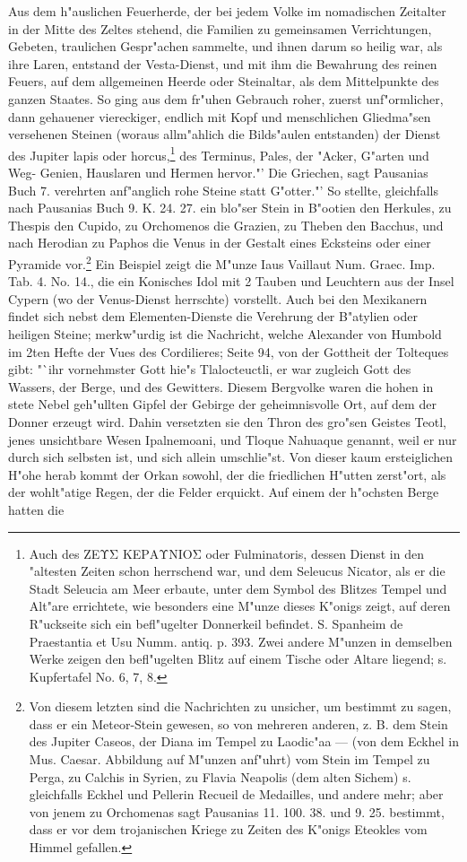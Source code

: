 \documentclass[a4paper, 11pt, oneside, polutonikogreek, german]{article}
\begin{document}
Aus dem h"auslichen Feuerherde, der bei jedem Volke im nomadischen Zeitalter in der Mitte des Zeltes stehend, die Familien zu gemeinsamen Verrichtungen, Gebeten, traulichen Gespr"achen sammelte, und ihnen darum so heilig war, als ihre Laren, entstand der Vesta-Dienst, und mit ihm die Bewahrung des reinen Feuers, auf dem allgemeinen Heerde oder Steinaltar, als dem Mittelpunkte des ganzen Staates. So ging aus dem fr"uhen Gebrauch roher, zuerst unf"ormlicher, dann gehauener viereckiger, endlich mit Kopf und menschlichen Gliedma"sen versehenen Steinen (woraus allm"ahlich die Bilds"aulen entstanden) der Dienst des Jupiter lapis oder horcus,\footnote{Auch des ΖΕΥΣ ΚΕΡΑΥΝΙΟΣ oder Fulminatoris, dessen Dienst in den "altesten Zeiten schon herrschend war, und dem Seleucus Nicator, als er die Stadt Seleucia am Meer erbaute, unter dem Symbol des Blitzes Tempel und Alt"are errichtete, wie besonders eine M"unze dieses K"onigs zeigt, auf deren R"uckseite sich ein befl"ugelter Donnerkeil befindet. S. Spanheim de Praestantia et Usu Numm. antiq. p. 393. Zwei andere M"unzen in demselben Werke zeigen den befl"ugelten Blitz auf einem Tische oder Altare liegend; s. Kupfertafel No. 6, 7, 8.} des Terminus, Pales, der "Acker, G"arten und Weg- Genien, Hauslaren und Hermen hervor."' Die Griechen, sagt Pausanias Buch 7. verehrten anf"anglich rohe Steine statt G"otter."' So stellte, gleichfalls nach Pausanias Buch 9. K. 24. 27. ein blo"ser Stein in B"ootien den Herkules, zu Thespis den Cupido, zu Orchomenos die Grazien, zu Theben den Bacchus, und nach Herodian zu Paphos die Venus in der Gestalt eines Ecksteins oder einer Pyramide vor.\footnote{Von diesem letzten sind die Nachrichten zu unsicher, um bestimmt zu sagen, dass er ein Meteor-Stein gewesen, so von mehreren anderen, z. B. dem Stein des Jupiter Caseos, der Diana im Tempel zu Laodic"aa --- (von dem Eckhel in Mus. Caesar. Abbildung auf M"unzen anf"uhrt) vom Stein im Tempel zu Perga, zu Calchis in Syrien, zu Flavia Neapolis (dem alten Sichem) s. gleichfalls Eckhel und Pellerin Recueil de Medailles, und andere mehr; aber von jenem zu Orchomenas sagt Pausanias 11. 100. 38. und 9. 25. bestimmt, dass er vor dem trojanischen Kriege zu Zeiten des K"onigs Eteokles vom Himmel gefallen.} Ein Beispiel zeigt die M"unze Iaus Vaillaut Num. Graec. Imp. Tab. 4. No. 14., die ein Konisches Idol mit 2 Tauben und Leuchtern aus der Insel Cypern (wo der Venus-Dienst herrschte) vorstellt. Auch bei den Mexikanern findet sich nebst dem Elementen-Dienste die Verehrung der B"atylien oder heiligen Steine; merkw"urdig ist die Nachricht, welche Alexander von Humbold im 2ten Hefte der Vues des Cordilieres; Seite 94, von der Gottheit der Tolteques gibt: "`ihr vornehmster Gott hie"s Tlalocteuctli, er war zugleich Gott des Wassers, der Berge, und des Gewitters. Diesem Bergvolke waren die hohen in stete Nebel geh"ullten Gipfel der Gebirge der geheimnisvolle Ort, auf dem der Donner erzeugt wird. Dahin versetzten sie den Thron des gro"sen Geistes Teotl, jenes unsichtbare Wesen Ipalnemoani, und Tloque Nahuaque genannt, weil er nur durch sich selbsten ist, und sich allein umschlie"st. Von dieser kaum ersteiglichen H"ohe herab kommt der Orkan sowohl, der die friedlichen H"utten zerst"ort, als der wohlt"atige Regen, der die Felder erquickt. Auf einem der h"ochsten Berge hatten die 
\end{document}
